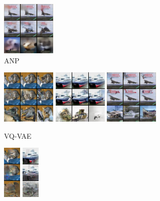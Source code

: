 \begin{figure}[t]
\begin{subfigure}[t]{0.17\textwidth}
      \includegraphics[height=\cifarimgheight]{figs/cigcvae/image-samples/cifar10/freeform_anp_3_samples}
      \caption{ANP}
    \end{subfigure}
    \begin{subfigure}[t]{0.17\textwidth}
      \centering
      \includegraphics[height=\cifarimgheight]{figs/cigcvae/image-samples/cifar10/freeform_vq_vae_0_samples}
      \includegraphics[height=\cifarimgheight]{figs/cigcvae/image-samples/cifar10/freeform_vq_vae_1_samples}
      \includegraphics[height=\cifarimgheight]{figs/cigcvae/image-samples/cifar10/freeform_vq_vae_3_samples}
      \caption{VQ-VAE}
    \end{subfigure}
    \begin{subfigure}[t]{0.08\textwidth}
      \centering
      \includegraphics[height=\cifarimgheight]{figs/cigcvae/image-samples/cifar10/freeform_ce_0_samples}
      \includegraphics[height=\cifarimgheight]{figs/cigcvae/image-samples/cifar10/freeform_ce_1_samples}

\end{subfigure}
\end{figure}
